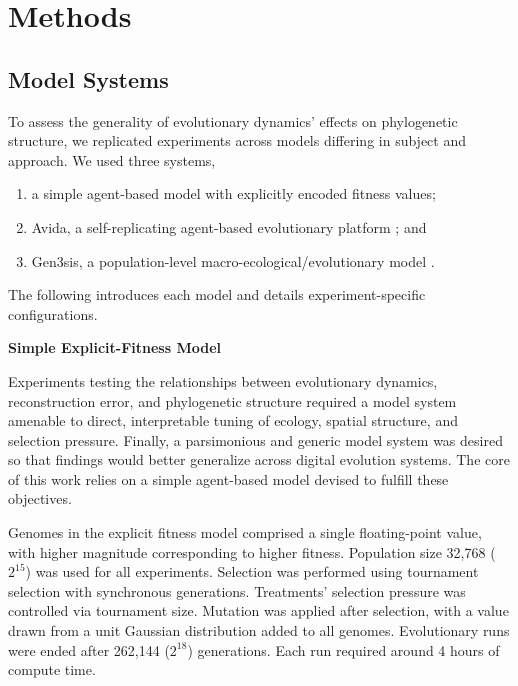 \section{Methods}
\label{sec:methods}

\subsection{Model Systems}

To assess the generality of evolutionary dynamics' effects on phylogenetic structure, we replicated experiments across models differing in subject and approach.
We used three systems,
\begin{enumerate}
\item a simple agent-based model with explicitly encoded fitness values;
\item Avida, a self-replicating agent-based evolutionary platform \citep{ofria2004avida}; and
\item Gen3sis, a population-level macro-ecological/evolutionary model \citep{hagen2021gen3sis}.
\end{enumerate}

The following introduces each model and details experiment-specific configurations.

\noindent
\textbf{Simple Explicit-Fitness Model}

\noindent
Experiments testing the relationships between evolutionary dynamics, reconstruction error, and phylogenetic structure required a model system amenable to direct, interpretable tuning of ecology, spatial structure, and selection pressure.
Finally, a parsimonious and generic model system was desired so that findings would better generalize across digital evolution systems.
The core of this work relies on a simple agent-based model devised to fulfill these objectives.

Genomes in the explicit fitness model comprised a single floating-point value, with higher magnitude corresponding to higher fitness.
Population size 32,768 ($2^{15}$) was used for all experiments.
Selection was performed using tournament selection with synchronous generations.
Treatments' selection pressure was controlled via tournament size.
Mutation was applied after selection, with a value drawn from a unit Gaussian distribution added to all genomes.
Evolutionary runs were ended after 262,144 ($2^{18}$) generations.
Each run required around 4 hours of compute time.

